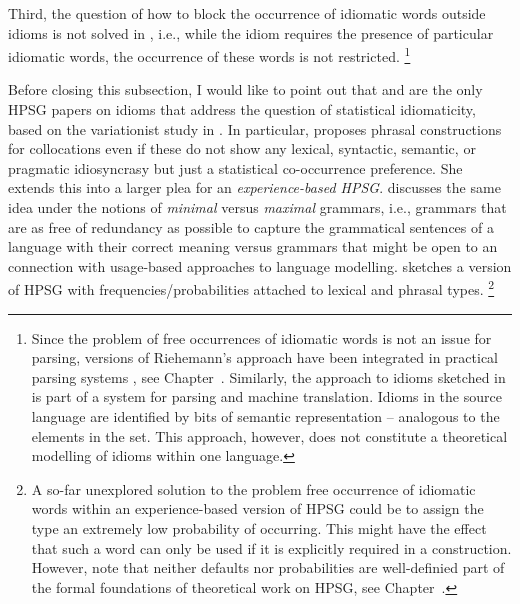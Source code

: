 \documentclass[output=paper]{langsci/langscibook}
\begin{document}
Third, the question of how to block the occurrence of idiomatic words outside idioms is not solved in \cite{Riehemann2001a}, i.e., while the idiom requires the presence of particular idiomatic words, the occurrence of these words is not restricted.%
\footnote{Since the problem of free occurrences of idiomatic words is not an issue for parsing, versions of Riehemann's approach have been integrated in practical parsing systems \citep{Villavicencio:Copestake:02}, see Chapter~. 
Similarly, the approach to idioms sketched in \cite{Flickinger:15Slides2} 
is part of a system for parsing and machine translation. Idioms in the source language are identified by bits of semantic representation -- analogous to the elements in the  set. This approach, however, does not constitute a theoretical modelling of idioms within one language.}


Before closing this subsection, I would like to point out that 
\cite{Riehemann2001a} and \cite{RB99a} are the only HPSG papers on idioms that address the question of statistical idiomaticity, based on the variationist study in \cite{Bender2000a}. 
In particular, \citet[--301]{Riehemann2001a} proposes phrasal constructions for collocations even if these do not show any lexical, syntactic, semantic, or pragmatic idiosyncrasy but just a statistical co-occurrence preference. 
She extends this into a larger plea for an \emph{experience-based HPSG}. 
%
\cite{Bender2000a} discusses the same idea under the notions of \emph{minimal} versus \emph{maximal} grammars, i.e., grammars that are as free of redundancy as possible to capture the grammatical sentences of a language with their correct meaning versus grammars that might be open to an connection with usage-based approaches to language modelling.
\citet[]{Bender2000a} sketches a version of HPSG with frequencies/probabilities attached to lexical and phrasal types.%
\footnote{A so-far unexplored solution to the problem free occurrence of idiomatic words within an experience-based version of HPSG could be to assign the type  an extremely low probability of occurring. This might have the effect that such a word can only be used if it is explicitly required in a construction. However, note that neither defaults nor probabilities are well-definied part of the formal foundations of theoretical work on HPSG, see Chapter~.}
\end{document}
